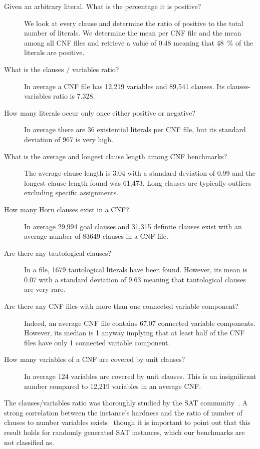 \begin{description}
\item[Given an arbitrary literal. What is the percentage it is positive?]
  We look at every clause and determine the ratio of positive to the total number of literals.
  We determine the mean per CNF file and the mean among all CNF files
  and retrieve a value of $0.48$ meaning that 48~\% of the literals are positive.
\item[What is the clauses / variables ratio?]
  In average a CNF file has 12,219 variables and 89,541 clauses.
  Its clauses-variables ratio is 7.328.
\item[How many literals occur only once either positive or negative?]
  In average there are 36 existential literals per CNF file,
  but its standard deviation of 967 is very high.
\item[What is the average and longest clause length among CNF benchmarks?]
  The average clause length is 3.04 with a standard deviation of 0.99
  and the longest clause length found was 61,473. Long clauses are typically
  outliers excluding specific assignments.
\item[How many Horn clauses exist in a CNF?]
  In average 29,994 goal clauses and 31,315 definite clauses exist
  with an average number of 83649 clauses in a CNF file.
\item[Are there any tautological clauses?]
  In a file, 1679 tautological literals have been found. However,
  its mean is 0.07 with a standard deviation of $9.63$ meaning that tautological
  clauses are very rare.
\item[Are there any CNF files with more than one connected variable component?]
  Indeed, an average CNF file contains 67.07 connected variable components.
  However, its median is 1 anyway implying that at least half of the CNF files
  have only 1 connected variable component.
\item[How many variables of a CNF are covered by unit clauses?]
  In average 124 variables are covered by unit clauses. This is an insignificant
  number compared to 12,219 variables in an average CNF.
\end{description}

The clauses/variables ratio was thoroughly studied by the SAT
community~\cite{nudelman2004understanding}.
A strong correlation between the instance's hardness and the ratio of number
of clauses to number variables exists~\cite{selman1996generating}
though it is important to point out that this result holds for randomly
generated SAT instances, which our benchmarks are not classified as.


